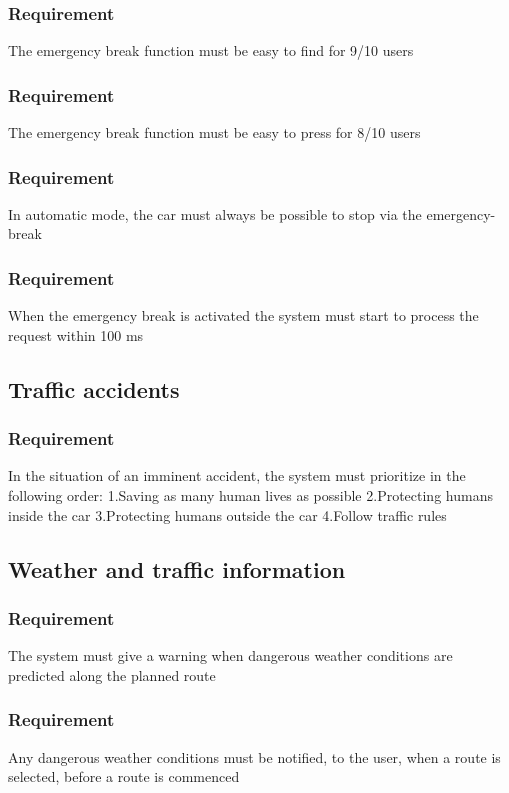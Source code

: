 \documentclass{article}
\begin{document}
{      \subsubsection{Requirement}
\hfill \break 
\- \- \-The emergency break function must be easy to find for 9/10 users
      \subsubsection{Requirement}
\hfill \break 
\- \- \-The emergency break function must be easy to press for 8/10 users
      \subsubsection{Requirement}
\hfill \break 
\- \- \-In automatic mode, the car must always be possible to stop via the emergency-break
      \subsubsection{Requirement}
\hfill \break 
\- \- \-When the emergency break is activated the system must start to process the request within 100 ms
  \subsection{Traffic accidents}
      \subsubsection{Requirement}
\hfill \break 
In the situation of an imminent accident, the system must prioritize in the following order:
\hfill \break 
\indent
1.Saving as many human lives as possible
\hfill \break 
\indent
2.Protecting humans inside the car
\hfill \break 
\indent
3.Protecting humans outside the car
\hfill \break 
\indent
4.Follow traffic rules
  \subsection{Weather and traffic information}
      \subsubsection{Requirement}
\hfill \break 
\- \- \-The system must give a warning when dangerous weather conditions are predicted along the planned route
      \subsubsection{Requirement}
\hfill \break 
\- \- \-Any dangerous weather conditions must be notified, to the user, when a route is selected, before a route is commenced
}
\end{document}
